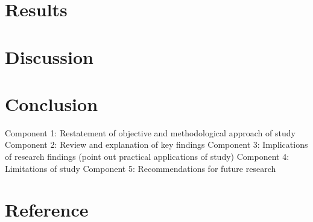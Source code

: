 \documentclass{article}
\begin{document}
\section{Results}

\section{Discussion}

\section{Conclusion}

Component 1: Restatement of objective and methodological approach of study
Component 2: Review and explanation of key findings Component 3: Implications
of research findings (point out practical applications of study) Component 4:
Limitations of study Component 5: Recommendations for future research

\section{Reference}
\end{document}
